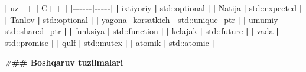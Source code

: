 \documentclass[a4paper,11pt,twoside,openright]{book}
\newenvironment{Shaded}{\begin{snugshade}}{\end{snugshade}}
\newcommand{\BuiltInTok}[1]{#1}
\newcommand{\ErrorTok}[1]{\textcolor[rgb]{0.64,0.00,0.00}{\textbf{#1}}}
\newcommand{\NormalTok}[1]{#1}
\newcommand{\OperatorTok}[1]{\textcolor[rgb]{0.81,0.36,0.00}{\textbf{#1}}}
\newcommand{\PreprocessorTok}[1]{\textcolor[rgb]{0.56,0.35,0.01}{\textit{#1}}}
\begin{document}
\begin{Shaded}
\begin{Highlighting}[]
\OperatorTok{|}\NormalTok{ uz}\OperatorTok{++} \OperatorTok{|}\NormalTok{ C}\OperatorTok{++} \OperatorTok{|}
\OperatorTok{|{-}{-}{-}{-}{-}{-}|{-}{-}{-}{-}{-}|}
\OperatorTok{|} \ErrorTok{\textasciigrave{}}\NormalTok{ixtiyoriy}\ErrorTok{\textasciigrave{}} \OperatorTok{|} \ErrorTok{\textasciigrave{}}\BuiltInTok{std::}\NormalTok{optional}\ErrorTok{\textasciigrave{}} \OperatorTok{|}
\OperatorTok{|} \ErrorTok{\textasciigrave{}}\NormalTok{Natija}\ErrorTok{\textasciigrave{}} \OperatorTok{|} \ErrorTok{\textasciigrave{}}\BuiltInTok{std::}\NormalTok{expected}\ErrorTok{\textasciigrave{}} \OperatorTok{|}
\OperatorTok{|} \ErrorTok{\textasciigrave{}}\NormalTok{Tanlov}\ErrorTok{\textasciigrave{}} \OperatorTok{|} \ErrorTok{\textasciigrave{}}\BuiltInTok{std::}\NormalTok{optional}\ErrorTok{\textasciigrave{}} \OperatorTok{|}
\OperatorTok{|} \ErrorTok{\textasciigrave{}}\NormalTok{yagona\_korsatkich}\ErrorTok{\textasciigrave{}} \OperatorTok{|} \ErrorTok{\textasciigrave{}}\BuiltInTok{std::}\NormalTok{unique\_ptr}\ErrorTok{\textasciigrave{}} \OperatorTok{|}
\OperatorTok{|} \ErrorTok{\textasciigrave{}}\NormalTok{umumiy}\ErrorTok{\textasciigrave{}} \OperatorTok{|} \ErrorTok{\textasciigrave{}}\BuiltInTok{std::}\NormalTok{shared\_ptr}\ErrorTok{\textasciigrave{}} \OperatorTok{|}
\OperatorTok{|} \ErrorTok{\textasciigrave{}}\NormalTok{funksiya}\ErrorTok{\textasciigrave{}} \OperatorTok{|} \ErrorTok{\textasciigrave{}}\BuiltInTok{std::}\NormalTok{function}\ErrorTok{\textasciigrave{}} \OperatorTok{|}
\OperatorTok{|} \ErrorTok{\textasciigrave{}}\NormalTok{kelajak}\ErrorTok{\textasciigrave{}} \OperatorTok{|} \ErrorTok{\textasciigrave{}}\BuiltInTok{std::}\NormalTok{future}\ErrorTok{\textasciigrave{}} \OperatorTok{|}
\OperatorTok{|} \ErrorTok{\textasciigrave{}}\NormalTok{vada}\ErrorTok{\textasciigrave{}} \OperatorTok{|} \ErrorTok{\textasciigrave{}}\BuiltInTok{std::}\NormalTok{promise}\ErrorTok{\textasciigrave{}} \OperatorTok{|}
\OperatorTok{|} \ErrorTok{\textasciigrave{}}\NormalTok{qulf}\ErrorTok{\textasciigrave{}} \OperatorTok{|} \ErrorTok{\textasciigrave{}}\BuiltInTok{std::}\NormalTok{mutex}\ErrorTok{\textasciigrave{}} \OperatorTok{|}
\OperatorTok{|} \ErrorTok{\textasciigrave{}}\NormalTok{atomik}\ErrorTok{\textasciigrave{}} \OperatorTok{|} \ErrorTok{\textasciigrave{}}\BuiltInTok{std::}\NormalTok{atomic}\ErrorTok{\textasciigrave{}} \OperatorTok{|}

\PreprocessorTok{\#}\ErrorTok{\#\# Boshqaruv tuzilmalari}


\end{Highlighting}
\end{Shaded}
\end{document}
